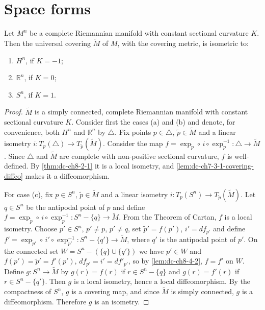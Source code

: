 \section{Space forms}

\begin{theorem}
  \label{thm:dc-ch8-4-1}


  Let $M^n$ be a complete Riemannian manifold with constant sectional curvature $K$.
  Then the universal covering $\tilde{M}$ of $M$, with the covering metric, is
  isometric to:
  \begin{enumerate}
    \item[(a)] $H^n$, if $K=-1$;
    \item[(b)] $\mathbb{R}^n$, if $K=0$;
    \item[(c)] $S^n$, if $K=1$.
  \end{enumerate}
\end{theorem}
\begin{proof}
\sketch
  $\tilde{M}$ is a simply connected, complete Riemannian
  manifold with constant sectional curvature $K$. Consider first the cases (a) and
  (b) and denote, for convenience, both $H^n$ and $\mathbb{R}^n$ by $\triangle$. Fix
  points $p\in\triangle$, $\tilde{p}\in\tilde{M}$ and a linear isometry
  $i:T_p(\triangle)\to T_{\tilde{p}}(\tilde{M})$. Consider the map
  $f=\exp_{\tilde{p}}\circ\,i\circ\exp_p^{-1}:\triangle\to\tilde{M}$. Since $\triangle$
  and $\tilde{M}$ are complete with non-positive sectional curvature, $f$ is
  well-defined. By \cref{thm:dc-ch8-2-1} it is a local isometry, and
  \cref{lem:dc-ch7-3-1-covering-diffeo} makes it a diffeomorphism.

  For case (c), fix $p\in S^n$, $\tilde{p}\in\tilde{M}$ and a linear isometry
  $i:T_p(S^n)\to T_{\tilde{p}}(\tilde{M})$. Let $q\in S^n$ be the antipodal point of
  $p$ and define $f=\exp_{\tilde{p}}\circ\,i\circ\exp_p^{-1}:S^n-\{q\}\to\tilde{M}$.
  From the Theorem of Cartan, $f$ is a local isometry. Choose $p'\in S^n$,
  $p'\neq p$, $p'\neq q$, set $\tilde{p}'=f(p')$, $i'=df_{p'}$ and define
  $f'=\exp_{\tilde{p}'}\circ\,i'\circ\exp_{p'}^{-1}:S^n-\{q'\}\to\tilde{M}$, where
  $q'$ is the antipodal point of $p'$. On the connected set
  $W=S^n-(\{q\}\cup\{q'\})$ we have $p'\in W$ and $f(p')=\tilde{p}'=f'(p')$,
  $df_{p'}=i'=df'_{p'}$, so by \cref{lem:dc-ch8-4-2}, $f=f'$ on $W$. Define
  $g:S^n\to\tilde{M}$ by $g(r)=f(r)$ if $r\in S^n-\{q\}$ and $g(r)=f'(r)$ if
  $r\in S^n-\{q'\}$. Then $g$ is a local isometry, hence a local diffeomorphism. By
  the compactness of $S^n$, $g$ is a covering map, and since $\tilde{M}$ is simply
  connected, $g$ is a diffeomorphism. Therefore $g$ is an isometry.
\end{proof}

